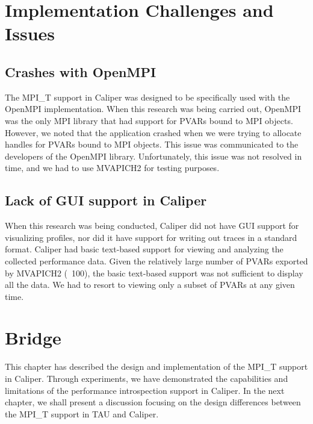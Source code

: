 \section{Implementation Challenges and Issues}
\subsection{Crashes with OpenMPI}
The MPI\_T support in Caliper was designed to be specifically used with the OpenMPI implementation. When this research was being carried out, OpenMPI was the only MPI library that had support for PVARs bound to MPI objects. However, we noted that the application crashed when we were trying to allocate handles for PVARs bound to MPI objects. This issue was communicated to the developers of the OpenMPI library. Unfortunately, this issue was not resolved in time, and we had to use MVAPICH2 for testing purposes.

\subsection{Lack of GUI support in Caliper}
When this research was being conducted, Caliper did not have GUI support for visualizing profiles, nor did it have support for writing out traces in a standard format. Caliper had basic text-based support for viewing and analyzing the collected performance data. Given the relatively large number of PVARs exported by MVAPICH2 (~100), the basic text-based support was not sufficient to display all the data. We had to resort to viewing only a subset of PVARs at any given time.

\section{Bridge}
This chapter has described the design and implementation of the MPI\_T support in Caliper. Through experiments, we have demonstrated the capabilities and limitations of the performance introspection support in Caliper. In the next chapter, we shall present a discussion focusing on the design differences between the MPI\_T support in TAU and Caliper. 
